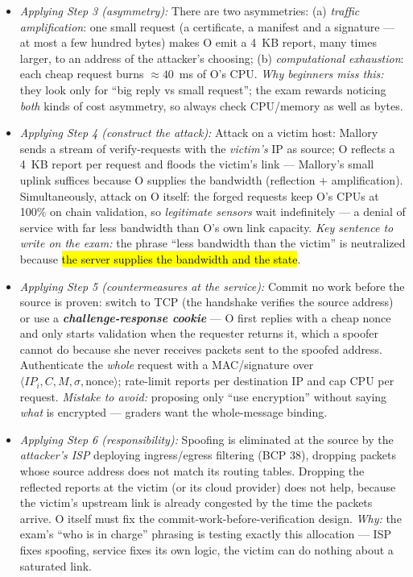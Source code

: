 \documentclass[12pt, a4paper]{article}
\newcommand{\term}[1]{\textbf{\textit{#1}}}        %
\newcommand{\imp}[1]{\hl{#1}}                       %
\begin{document}
\begin{itemize}
    Because UDP is connectionless, $IP_i$ can be forged: the attacker simply writes any address she likes into the packet. \emph{Why this matters:} an attack needs both an asymmetry (Step 3) and a way to aim it; the missing authentication is what lets the attacker aim O's output at someone else.
    \item \textit{Applying Step 3 (asymmetry):} There are two asymmetries: (a) \emph{traffic amplification}: one small request (a certificate, a manifest and a signature --- at most a few hundred bytes) makes O emit a 4~KB report, many times larger, to an address of the attacker's choosing;
    (b) \emph{computational exhaustion}: each cheap request burns $\approx 40$~ms of O's CPU. \emph{Why beginners miss this:} they look only for ``big reply vs small request''; the exam rewards noticing \emph{both} kinds of cost asymmetry, so always check CPU/memory as well as bytes.
    \item \textit{Applying Step 4 (construct the attack):} Attack on a victim host: Mallory sends a stream of verify-requests with the \emph{victim's} IP as source; O reflects a 4~KB report per request and floods the victim's link --- Mallory's small uplink suffices because O supplies the bandwidth (reflection $+$ amplification).
    Simultaneously, attack on O itself: the forged requests keep O's CPUs at 100\% on chain validation, so \emph{legitimate sensors} wait indefinitely --- a denial of service with far less bandwidth than O's own link capacity.
    \emph{Key sentence to write on the exam:} the phrase ``less bandwidth than the victim'' is neutralized because \imp{the server supplies the bandwidth and the state}.
    \item \textit{Applying Step 5 (countermeasures at the service):} Commit no work before the source is proven: switch to TCP (the handshake verifies the source address) or use a \term{challenge-response cookie} --- O first replies with a cheap nonce and only starts validation when the requester returns it, which a spoofer cannot do because she never receives packets sent to the spoofed address.
    Authenticate the \emph{whole} request with a MAC/signature over $\langle IP_i, C, M, \sigma, \text{nonce} \rangle$; rate-limit reports per destination IP and cap CPU per request.
    \emph{Mistake to avoid:} proposing only ``use encryption'' without saying \emph{what} is encrypted --- graders want the whole-message binding.
    \item \textit{Applying Step 6 (responsibility):} Spoofing is eliminated at the source by the \emph{attacker's ISP} deploying ingress/egress filtering (BCP 38), dropping packets whose source address does not match its routing tables.
    Dropping the reflected reports at the victim (or its cloud provider) does not help, because the victim's upstream link is already congested by the time the packets arrive.
    O itself must fix the commit-work-before-verification design. \emph{Why:} the exam's ``who is in charge'' phrasing is testing exactly this allocation --- ISP fixes spoofing, service fixes its own logic, the victim can do nothing about a saturated link.
\end{itemize}
\end{document}
